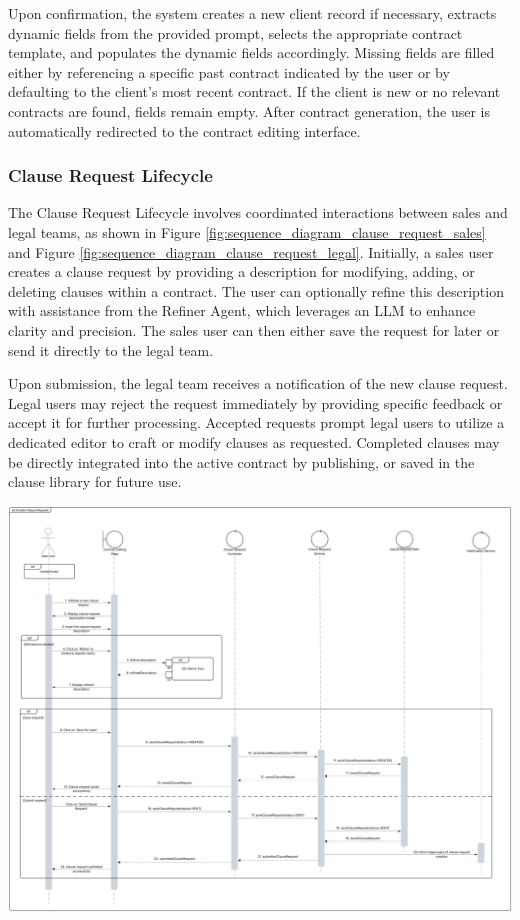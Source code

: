 Upon confirmation, the system creates a new client record if necessary, extracts dynamic fields from the provided prompt, selects the appropriate contract template, and populates the dynamic fields accordingly. Missing fields are filled either by referencing a specific past contract indicated by the user or by defaulting to the client's most recent contract. If the client is new or no relevant contracts are found, fields remain empty. After contract generation, the user is automatically redirected to the contract editing interface.

\subsubsection{Clause Request Lifecycle}

The Clause Request Lifecycle involves coordinated interactions between sales and legal teams, as shown in Figure \ref{fig:sequence_diagram_clause_request_sales} and Figure \ref{fig:sequence_diagram_clause_request_legal}. Initially, a sales user creates a clause request by providing a description for modifying, adding, or deleting clauses within a contract. The user can optionally refine this description with assistance from the Refiner Agent, which leverages an LLM to enhance clarity and precision. The sales user can then either save the request for later or send it directly to the legal team.\mynewline

Upon submission, the legal team receives a notification of the new clause request. Legal users may reject the request immediately by providing specific feedback or accept it for further processing. Accepted requests prompt legal users to utilize a dedicated editor to craft or modify clauses as requested. Completed clauses may be directly integrated into the active contract by publishing, or saved in the clause library for future use.

\begin{center}
    \centering
    \includegraphics[width=1\textwidth]{Images/Sequence Diagram - Sales - Clause Request.png}
    \label{fig:sequence_diagram_clause_request_sales}
\end{center}

